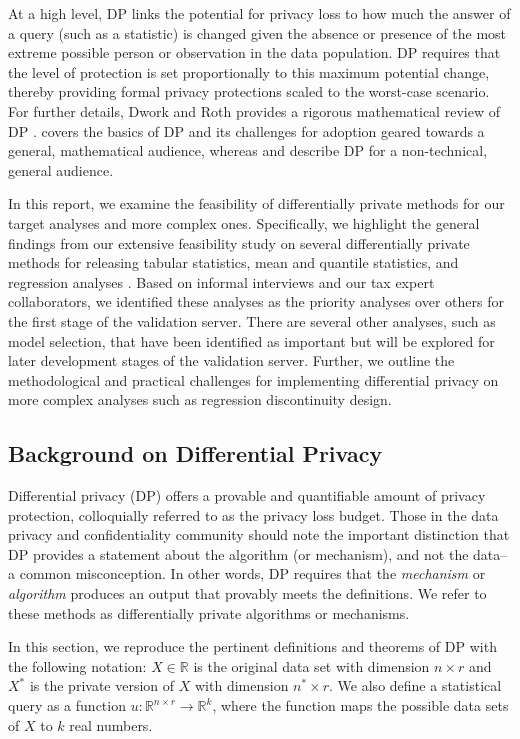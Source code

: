 At a high level, DP links the potential for privacy loss to how much the answer of a query (such as a statistic) is changed given the absence or presence of the most extreme possible person or observation in the data population. DP requires that the level of protection is set proportionally to this maximum potential change, thereby providing formal privacy protections scaled to the worst-case scenario. For further details, Dwork and Roth provides a rigorous mathematical review of DP \autocite{dwork2014algorithmic}. \cite{bowen2021philosophy} covers the basics of DP and its challenges for adoption geared towards a general, mathematical audience, whereas \cite{nissim2017differential} and \cite{snoke2019differential} describe DP for a non-technical, general audience. 

In this report, we examine the feasibility of differentially private methods for our target analyses and more complex ones. Specifically, we highlight the general findings from our extensive feasibility study on several differentially private methods for releasing tabular statistics, mean and quantile statistics, and regression analyses \autocite{barrientos2021}. Based on informal interviews and our tax expert collaborators, we identified these analyses as the priority analyses over others for the first stage of the validation server. There are several other analyses, such as model selection, that have been identified as important but will be explored for later development stages of the validation server. Further, we outline the methodological and practical challenges for implementing differential privacy on more complex analyses such as regression discontinuity design.

\subsection{Background on Differential Privacy}\label{subsec:dp}
Differential privacy (DP) offers a provable and quantifiable amount of privacy protection, colloquially referred to as the privacy loss budget. Those in the data privacy and confidentiality community should note the important distinction that DP provides a statement about the algorithm (or mechanism), and not the data--a common misconception. In other words, DP requires that the \textit{mechanism} or \textit{algorithm} produces an output that provably meets the definitions. We refer to these methods as differentially private algorithms or mechanisms.

In this section, we reproduce the pertinent definitions and theorems of DP with the following notation: $X\in\mathbb{R}$ is the original data set  with dimension ${n\times r}$ and $X^*$ is the private version of $X$ with dimension ${n^*\times r}$. We also define a statistical query as a function $u:\mathbb{R}^{n\times r}\rightarrow\mathbb{R}^k$, where the function maps the possible data sets of $X$ to $k$ real numbers.

